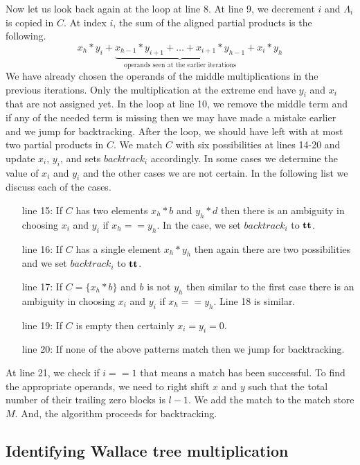 Now let us look back again at the loop at line 8.
%
At line 9, we decrement $i$ and $\Lambda_i$ is copied in $C$.
%
At index $i$, the sum of the aligned partial products is the following.
$$
x_{h}*y_{i} + \underbrace{x_{h-1}*y_{i+1} + \dots + x_{i+1}*y_{h-1}}_{\text{operands seen at the earlier iterations}} + x_{i}*y_{h}
$$
We have already chosen the operands of the middle multiplications in the previous iterations.
%
Only the multiplication at the extreme end have $y_i$ and $x_i$ that are
not assigned yet.
%
In the loop at line 10, we remove the middle term and if any of the needed
term is missing then we may have made a mistake earlier and we jump for
backtracking.
%
After the loop, we should have left with at most two partial products in $C$.
%
We match $C$ with six possibilities at lines 14-20 and
update $x_i$, $y_i$, and sets $backtrack_i$ accordingly.
%
In some cases we determine the value of $x_i$ and $y_i$ and the other
cases we are not certain. 
%
In the following list we discuss each of the cases.
%
\begin{itemize}
\item[line 15:] If $C$ has two elements $x_h*b$ and $y_h*d$ then
there is an ambiguity in choosing $x_i$ and $y_i$
if $x_h == y_h$.
%
In the case, we set $backtrack_i$ to $\mathbf{tt}$.
\item[line 16:] If $C$ has a single element $x_h*y_h$ then again there  
are two possibilities and we set $backtrack_i$ to $\mathbf{tt}$.
\item[line 17:] If $C = \{x_h*b\}$ and $b$ is not $y_h$ then 
  similar to the first case there is an ambiguity in
  choosing $x_i$ and $y_i$ if $x_h == y_h$. Line 18 is similar.
\item[line 19:] If $C$ is empty then certainly $x_i = y_i = 0$.
\item[line 20:] If none of the above patterns match then we jump for
  backtracking.
\end{itemize}
%
At line 21, we check if $i==1$ that means a match has been successful.
%
To find the appropriate operands, we need to right shift $x$ and $y$
such that the total number of their trailing zero blocks is $l-1$.
%
We add the match to the match store $M$.
%
And, the algorithm proceeds for backtracking.

\subsection{Identifying Wallace tree multiplication}


